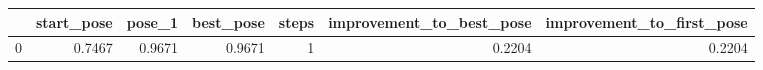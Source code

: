 \begin{tabular}{lrrrrrr}
\toprule
{} &  start\_pose &  pose\_1 &  best\_pose &  steps &  improvement\_to\_best\_pose &  improvement\_to\_first\_pose \\
\midrule
0 &      0.7467 &  0.9671 &     0.9671 &      1 &                    0.2204 &                     0.2204 \\
\bottomrule
\end{tabular}
